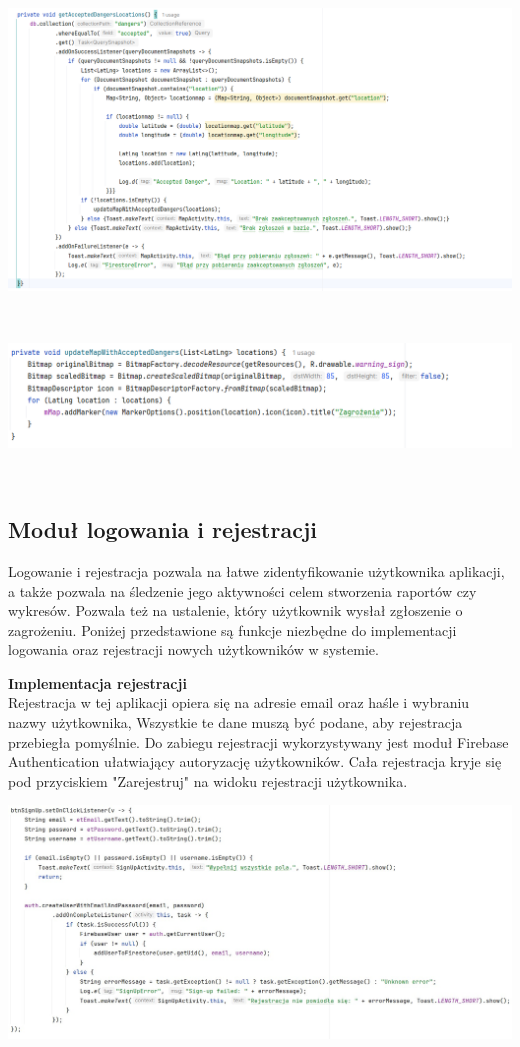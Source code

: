 \noindent
\begin{minipage}{\linewidth}
    \label{lst:getaccepted}
    \centering
    \includegraphics[width=0.6\linewidth]{img/kod/imp-getacceptedloc.png}
\end{minipage}
\\

\noindent
\begin{minipage}{\linewidth}
    \label{lst:markeraccepted}
    \centering
    \includegraphics[width=0.6\linewidth]{img/kod/imp-updatemap.png}
\end{minipage}
\\
\subsection{Moduł logowania i rejestracji}
Logowanie i rejestracja pozwala na łatwe zidentyfikowanie użytkownika aplikacji, a także pozwala na śledzenie jego aktywności celem stworzenia raportów czy wykresów. Pozwala też na ustalenie, który użytkownik wysłał zgłoszenie o zagrożeniu. Poniżej przedstawione są funkcje niezbędne do implementacji logowania oraz rejestracji nowych użytkowników w systemie.

\textbf{Implementacja rejestracji}\\
\indent Rejestracja w tej aplikacji opiera się na adresie email oraz haśle i wybraniu nazwy użytkownika, Wszystkie te dane muszą być podane, aby rejestracja przebiegła pomyślnie. Do zabiegu rejestracji wykorzystywany jest moduł Firebase Authentication ułatwiający autoryzację użytkowników. Cała rejestracja kryje się pod przyciskiem "Zarejestruj" na widoku rejestracji użytkownika.\\
\noindent
\begin{minipage}{\linewidth}
    \label{lst:register}
    \centering
    \includegraphics[width=0.6\linewidth]{img/kod/imp-reje.jpg}
\end{minipage}
\\

